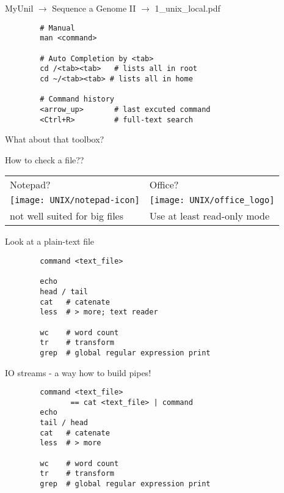 \documentclass[xcolor=dvipsnames]{beamer}
\begin{document}
\begin{frame}[fragile]
	\begin{center}
		MyUnil $\rightarrow$ Sequence a Genome II $\rightarrow$ 1\_unix\_local.pdf
	\end{center}
	\Large
	\begin{verbatim}
		# Manual	
		man <command>
		
		# Auto Completion by <tab>
		cd /<tab><tab>   # lists all in root
		cd ~/<tab><tab> # lists all in home
		
		# Command history
		<arrow_up>       # last excuted command
		<Ctrl+R>         # full-text search
	\end{verbatim}
\end{frame}

\begin{frame}
	\Huge
	\begin{center}
		What about that toolbox?	
	\end{center}
\end{frame}

\begin{frame}
	\begin{center}
	\huge
	How to check a file?? \\
	\vspace{1cm}
	
	\Large
	\begin{tabular}{C{0.4\textwidth}C{0.4\textwidth}}
	Notepad? & Office? \\
	\texttt{[image: UNIX/notepad-icon]} & \texttt{[image: UNIX/office\_logo]} \\
	\small not well suited for big files & \small Use at least read-only mode\\
	\end{tabular}
	\end{center}
\end{frame}

\begin{frame}[fragile]
	\huge
	Look at a plain-text file
	\Large
	\begin{verbatim}
		command <text_file>	
	
		echo
		head / tail 
		cat   # catenate
		less  # > more; text reader
		
		wc    # word count
		tr    # transform
		grep  # global regular expression print 
	\end{verbatim}
\end{frame}

\begin{frame}[fragile]
	\huge
	IO streams - a way how to build pipes!
	\Large
	\begin{verbatim}
		command <text_file> 
	           == cat <text_file> | command
		echo
		tail / head
		cat   # catenate
		less  # > more
		
		wc    # word count
		tr    # transform
		grep  # global regular expression print 
	\end{verbatim}
\end{frame}
\end{document}
